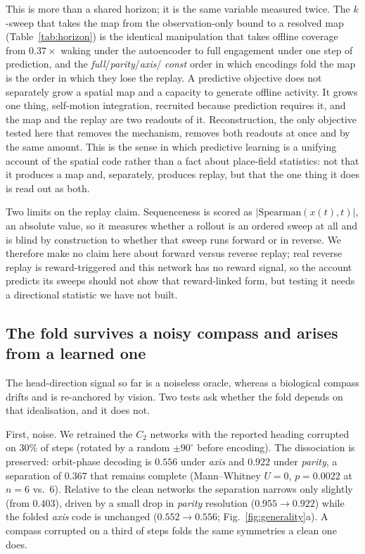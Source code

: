 This is more than a shared horizon; it is the same variable measured twice. The $k$-sweep that takes
the map from the observation-only bound to a resolved map (Table~\ref{tab:horizon}) is the identical
manipulation that takes offline coverage from $0.37\times$ waking under the autoencoder to full
engagement under one step of prediction, and the \textit{full}/\textit{parity}/\textit{axis}/%
\textit{const} order in which encodings fold the map is the order in which they lose the replay. A
predictive objective does not separately grow a spatial map and a capacity to generate offline
activity. It grows one thing, self-motion integration, recruited because prediction requires it, and
the map and the replay are two readouts of it. Reconstruction, the only objective tested here that
removes the mechanism, removes both readouts at once and by the same amount. This is the sense in which
predictive learning is a unifying account of the spatial code rather than a fact about place-field
statistics: not that it produces a map and, separately, produces replay, but that the one thing it
does is read out as both.

Two limits on the replay claim. Sequenceness is scored as $|\mathrm{Spearman}(x(t), t)|$, an absolute
value, so it measures whether a rollout is an ordered sweep at all and is blind by construction to
whether that sweep runs forward or in reverse. We therefore make no claim here about forward versus
reverse replay; real reverse replay is reward-triggered \citep{fosterwilson2006, dibabuzsaki2007} and
this network has no reward signal, so the account predicts its sweeps should not show that
reward-linked form, but testing it needs a directional statistic we have not built.

\subsection*{The fold survives a noisy compass and arises from a learned one}

The head-direction signal so far is a noiseless oracle, whereas a biological compass drifts and is
re-anchored by vision. Two tests ask whether the fold depends on that idealisation, and it does not.

First, noise. We retrained the $C_2$ networks with the reported heading corrupted on $30\%$ of steps
(rotated by a random $\pm 90^\circ$ before encoding). The dissociation is preserved: orbit-phase
decoding is $0.556$ under \textit{axis} and $0.922$ under \textit{parity}, a separation of $0.367$
that remains complete (Mann--Whitney $U = 0$, $p = 0.0022$ at $n = 6$ vs.\ $6$). Relative to the clean
networks the separation narrows only slightly (from $0.403$), driven by a small drop in \textit{parity}
resolution ($0.955 \to 0.922$) while the folded \textit{axis} code is unchanged ($0.552 \to 0.556$;
Fig.~\ref{fig:generality}a). A compass corrupted on a third of steps folds the same symmetries a clean
one does.

